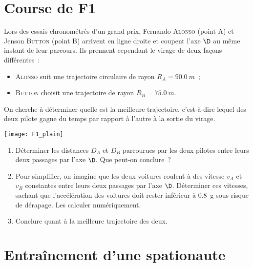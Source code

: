\documentclass[a4paper, 12pt, final, garamond]{book}
\begin{document}
\section{Course de F1}
\hspace*{-0.75cm}
\begin{minipage}{0.70\linewidth}
    Lors des essais chronométrés d'un grand prix, Fernando \textsc{Alonso} (point A)
    et Jenson \textsc{Button} (point B) arrivent en ligne droite et coupent l'axe
    $\D$ au même instant de leur parcours. Ils prennent cependant le virage de deux
    façons différentes~: \bigbreak
    \begin{itemize}
        \item \textsc{Alonso} suit une trajectoire circulaire de rayon $R_A =
            \SI{90.0}{m}$~;
        \item \textsc{Button} choisit une trajectoire de rayon $R_B = \SI{75.0}{m}$.
    \end{itemize} \bigbreak
    On cherche à déterminer quelle est la meilleure trajectoire, c'est-à-dire
    lequel des deux pilote gagne du temps par rapport à l'autre à la sortie du
    virage.
\end{minipage}
\hfill
\begin{minipage}{0.25\linewidth}
    \begin{center}
        \texttt{[image: F1\_plain]}
    \end{center}
\end{minipage}
\bigbreak
\begin{enumerate}
    \item Déterminer les distances $D_A$ et $D_B$ parcourues par les deux
        pilotes entre leurs deux passages par l'axe $\D$. Que peut-on conclure~?
    \item Pour simplifier, on imagine que les deux voitures roulent à des
        vitesse $v_A$ et $v_B$ constantes entre leurs deux passages par l'axe
        $\D$. Déterminer ces vitesses, sachant que l'accélération des voitures
        doit rester inférieur à \SI{0.8}{g} sous risque de dérapage. Les
        calculer numériquement.
    \item Conclure quant à la meilleure trajectoire des deux.
\end{enumerate}

\section{Entraînement d'une spationaute}
\end{document}
